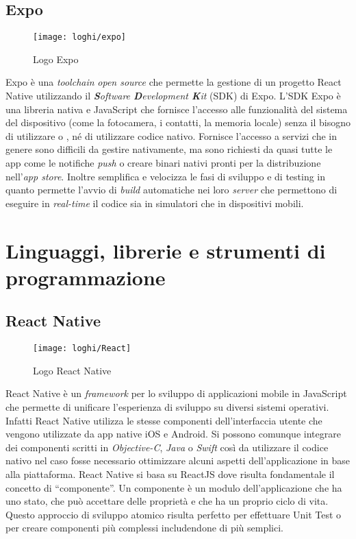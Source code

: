 \subsection{Expo} \label{subsec:expo}
	\begin{figure}[H] 
		\centering
		\texttt{[image: loghi/expo]}
		\caption{Logo Expo}
	\end{figure}
Expo è una \emph{toolchain} \emph{open source} che permette la gestione di un progetto React Native utilizzando il \emph{\textbf{S}oftware \textbf{D}evelopment \textbf{K}it} (\acrshort{SDK}) di Expo. L'SDK Expo è una libreria nativa e JavaScript 
che fornisce l'accesso alle funzionalità del sistema del dispositivo (come la 
fotocamera, i contatti, la memoria locale) senza il bisogno di utilizzare  
o , né di utilizzare codice nativo. Fornisce l'accesso a servizi 
che in genere sono difficili da gestire nativamente, ma sono richiesti da quasi 
tutte le app come le notifiche \emph{push} o creare binari nativi pronti per la 
distribuzione nell'\emph{app store}.
Inoltre semplifica e velocizza le fasi di sviluppo e di testing in quanto
permette l'avvio di \emph{build} automatiche nei loro \emph{server} che
permettono di eseguire in \emph{real-time} il codice sia in simulatori che in
dispositivi mobili.


\section{Linguaggi, librerie e strumenti di programmazione}

\subsection{React Native}
\begin{figure}[H] 
	\centering
	\texttt{[image: loghi/React]}
	\caption{Logo React Native}
\end{figure}
React Native è un \emph{framework} per lo sviluppo di applicazioni mobile in JavaScript 
che permette di unificare l'esperienza di sviluppo su diversi sistemi operativi. 
Infatti React Native utilizza le stesse componenti dell'interfaccia 
utente che vengono utilizzate da app native iOS e Android.
Si possono comunque integrare dei componenti scritti in \emph{Objective-C}, 
\emph{Java} o \emph{Swift} così da utilizzare il codice nativo nel caso fosse
necessario 
ottimizzare alcuni aspetti dell'applicazione in base alla piattaforma. 
React Native si basa su ReactJS dove risulta fondamentale il concetto di 
``componente''. Un componente è un modulo dell'applicazione che ha uno stato, 
che può accettare delle proprietà e che ha un proprio ciclo di vita. 
Questo approccio di sviluppo atomico risulta perfetto per effettuare Unit Test 
o per creare componenti più complessi includendone di più semplici.

